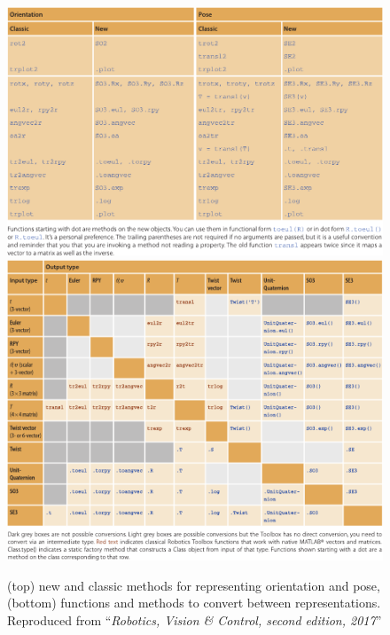 \documentclass[a4paper,twoside]{report}
\begin{document}
\begin{figure}[p]
\centering
\includegraphics[width=\textwidth]{figs/CT-02-03.pdf}
\includegraphics[width=\textwidth]{figs/CT-02-02.pdf}
\caption{(top) new and classic methods for representing orientation and pose, (bottom) functions and methods to convert
between representations.  Reproduced from ``\textit{Robotics, Vision \& Control, second edition, 2017}''}\label{fig:newfunctions}
\end{figure}
\end{document}
